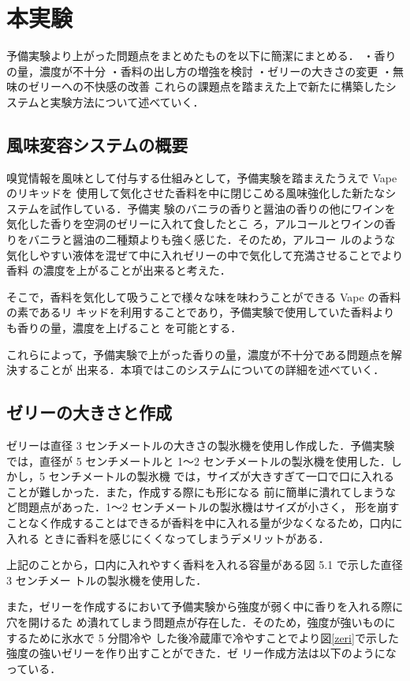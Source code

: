 \section{本実験}
予備実験より上がった問題点をまとめたものを以下に簡潔にまとめる．
・香りの量，濃度が不十分
・香料の出し方の増強を検討
・ゼリーの大きさの変更
・無味のゼリーへの不快感の改善
これらの課題点を踏まえた上で新たに構築したシステムと実験方法について述べていく．


\subsection{風味変容システムの概要}

嗅覚情報を風味として付与する仕組みとして，予備実験を踏まえたうえで Vape のリキッドを
使用して気化させた香料を中に閉じこめる風味強化した新たなシステムを試作している．予備実
験のバニラの香りと醤油の香りの他にワインを気化した香りを空洞のゼリーに入れて食したとこ
ろ，アルコールとワインの香りをバニラと醤油の二種類よりも強く感じた．そのため，アルコー
ルのような気化しやすい液体を混ぜて中に入れゼリーの中で気化して充満させることでより香料
の濃度を上がることが出来ると考えた．


そこで，香料を気化して吸うことで様々な味を味わうことができる Vape の香料の素であるリ
キッドを利用することであり，予備実験で使用していた香料よりも香りの量，濃度を上げること
を可能とする．


これらによって，予備実験で上がった香りの量，濃度が不十分である問題点を解決することが
出来る．本項ではこのシステムについての詳細を述べていく．


\subsection{ゼリーの大きさと作成}

ゼリーは直径 3 センチメートルの大きさの製氷機を使用し作成した．予備実験では，直径が 5
センチメートルと 1～2 センチメートルの製氷機を使用した．しかし，5 センチメートルの製氷機
では，サイズが大きすぎて一口で口に入れることが難しかった．また，作成する際にも形になる
前に簡単に潰れてしまうなど問題点があった．1～2 センチメートルの製氷機はサイズが小さく，
形を崩すことなく作成することはできるが香料を中に入れる量が少なくなるため，口内に入れる
ときに香料を感じにくくなってしまうデメリットがある．


上記のことから，口内に入れやすく香料を入れる容量がある図 5.1 で示した直径 3 センチメー
トルの製氷機を使用した．


また，ゼリーを作成するにおいて予備実験から強度が弱く中に香りを入れる際に穴を開けるた
め潰れてしまう問題点が存在した．そのため，強度が強いものにするために氷水で 5 分間冷や
した後冷蔵庫で冷やすことでより図\ref{zeri}で示した強度の強いゼリーを作り出すことができた．ゼ
リー作成方法は以下のようになっている．


